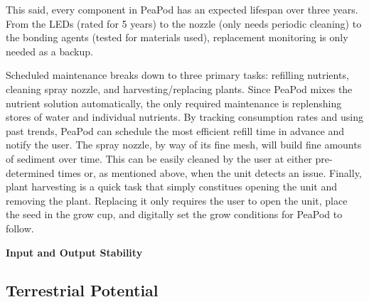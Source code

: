 \documentclass{report}
\begin{document}
This said, every component in PeaPod has an expected lifespan over three years. From the LEDs (rated for 5 years) to the nozzle (only needs periodic cleaning) to the bonding agents (tested for materials used), replacement monitoring is only needed as a backup.

Scheduled maintenance breaks down to three primary tasks: refilling nutrients, cleaning spray nozzle, and harvesting/replacing plants.
Since PeaPod mixes the nutrient solution automatically, the only required maintenance is replenshing stores of water and individual nutrients. By tracking consumption rates and using past trends, PeaPod can schedule the most efficient refill time in advance and notify the user.
The spray nozzle, by way of its fine mesh, will build fine amounts of sediment over time. This can be easily cleaned by the user at either pre-determined times or, as mentioned above, when the unit detects an issue.
Finally, plant harvesting is a quick task that simply constitues opening the unit and removing the plant. Replacing it only requires the user to open the unit, place the seed in the grow cup, and digitally set the grow conditions for PeaPod to follow.

\textbf{Input and Output Stability}
\label{sec:reliability-inputoutput}







\subsection{Terrestrial Potential}
\label{sec:terrestrial}


\end{document}
